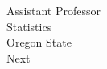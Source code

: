 \documentclass[aspectratio=169]{beamer}
\theoremstyle{remark}
\begin{document}
\begin{frame}
\begin{columns}
\begin{column}{0.33\textwidth}
            Assistant Professor \\
            Statistics \\
            Oregon State \\
            \vspace{4mm}
            Next \\
            \vspace{6mm}
        \end{column}
    \end{columns}
    
\end{frame}
\end{document}
